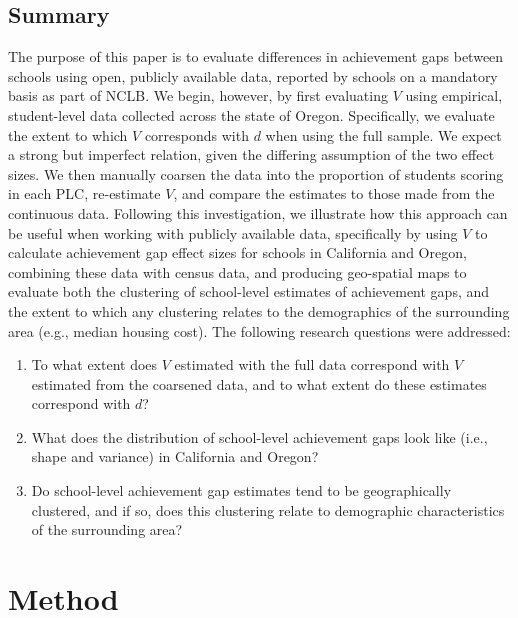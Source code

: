 \documentclass[man, fleqn, noextraspace]{apa6}
\providecommand{\tightlist}{%
  \setlength{\itemsep}{0pt}\setlength{\parskip}{0pt}}
\theoremstyle{definition}
\theoremstyle{definition}
\theoremstyle{definition}
\theoremstyle{remark}
\begin{document}
\hypertarget{summary}{%
\subsection{Summary}\label{summary}}

The purpose of this paper is to evaluate differences in achievement gaps
between schools using open, publicly available data, reported by schools
on a mandatory basis as part of NCLB. We begin, however, by first
evaluating \(V\) using empirical, student-level data collected across
the state of Oregon. Specifically, we evaluate the extent to which \(V\)
corresponds with \(d\) when using the full sample. We expect a strong
but imperfect relation, given the differing assumption of the two effect
sizes. We then manually coarsen the data into the proportion of students
scoring in each PLC, re-estimate \(V\), and compare the estimates to
those made from the continuous data. Following this investigation, we
illustrate how this approach can be useful when working with publicly
available data, specifically by using \(V\) to calculate achievement gap
effect sizes for schools in California and Oregon, combining these data
with census data, and producing geo-spatial maps to evaluate both the
clustering of school-level estimates of achievement gaps, and the extent
to which any clustering relates to the demographics of the surrounding
area (e.g., median housing cost). The following research questions were
addressed:

\begin{enumerate}
\def\labelenumi{\arabic{enumi}.}
\tightlist
\item
  To what extent does \(V\) estimated with the full data correspond with
  \(V\) estimated from the coarsened data, and to what extent do these
  estimates correspond with \(d\)?
\item
  What does the distribution of school-level achievement gaps look like
  (i.e., shape and variance) in California and Oregon?
\item
  Do school-level achievement gap estimates tend to be geographically
  clustered, and if so, does this clustering relate to demographic
  characteristics of the surrounding area?
\end{enumerate}

\hypertarget{method}{%
\section{Method}\label{method}}
\end{document}
